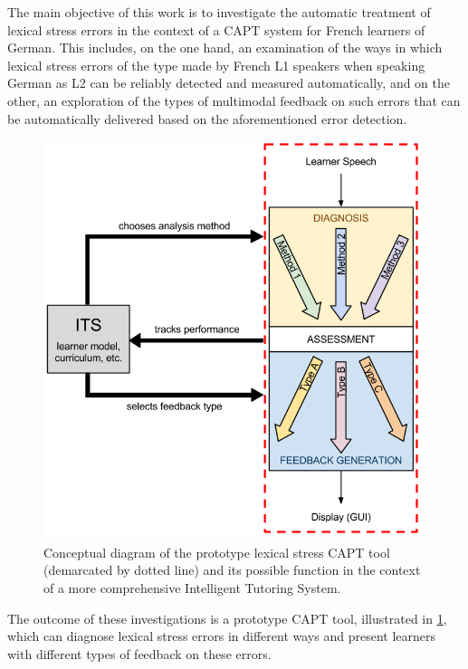 The main objective of this work is to investigate the automatic treatment of lexical stress errors in the context of a CAPT system for French learners of German. This includes, on the one hand, an examination of the ways in which lexical stress errors of the type made by French L1 speakers when speaking German as L2 can be reliably detected and measured %
automatically, and on the other, an exploration of the types of multimodal feedback on such errors that can be automatically delivered based on the aforementioned error detection. 
%
	\begin{figure}[thb] 
		\centering
		\includegraphics[height=.45\textheight]{../img/hourglass-ITS} 
		\caption[Conceptual diagram of the prototype lexical stress CAPT tool]{Conceptual diagram of the prototype lexical stress CAPT tool (demarcated by dotted line) and its possible function in the context of a more comprehensive Intelligent Tutoring System.}
		\label{fig:hourglass-ITS}
	\end{figure}
%
The outcome of these investigations is a prototype CAPT tool, illustrated in \cref{fig:hourglass-ITS},
which can diagnose lexical stress errors in different ways and present learners with different types of feedback on these errors.


